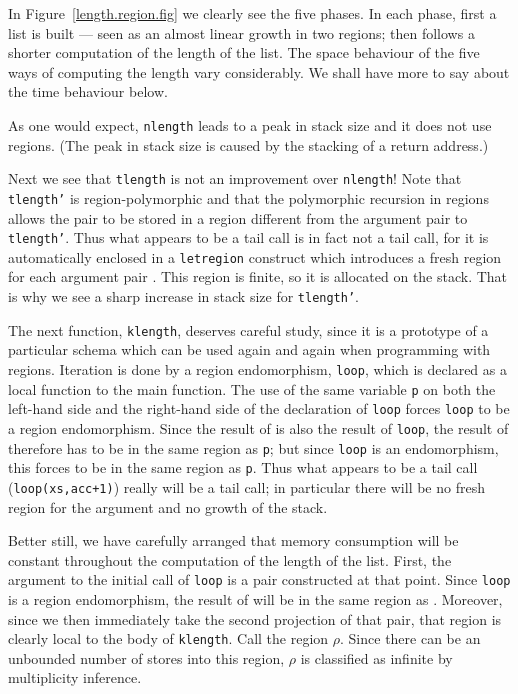 \documentclass[12pt]{book}
\begin{document}
In Figure~\ref{length.region.fig} we clearly see the five phases.
In each phase, first a list is built ---
seen as an almost linear growth in
two regions; 
then follows a shorter computation of the length of the list.
The space behaviour of the five ways of computing the length
vary considerably. We shall have more to say about the time behaviour
below.

As one would expect, 
{\tt nlength} leads to a peak in stack size and it
does not use regions. (The peak in stack size is caused by the
stacking of a return address.)

Next we see that {\tt tlength} is not an improvement over
{\tt nlength}! Note that {\tt tlength'} is region-polymorphic and that the
polymorphic recursion in regions allows the pair 
to be stored in a region different from  the argument pair to {\tt tlength'}.
Thus what appears to be a tail call is in fact not a tail call, for
it is automatically enclosed in a {\tt letregion} construct which introduces
a fresh region for each argument pair . This region is finite, so it is
allocated on the stack. That is why we see a sharp increase in
stack size for {\tt tlength'}.

The next function, {\tt klength}, deserves careful study, since
it is a prototype of a particular schema
which can be used again and again when programming with
regions. Iteration is done by a region endomorphism,
{\tt loop}, which is
declared as a local function to the main function. The use of
the same variable {\tt p} on both the left-hand side and the right-hand
side of the declaration of {\tt loop} forces {\tt loop} to be a region
endomorphism. Since the result of 
 is also the result of {\tt loop}, the
result of  therefore has to be in the same region as {\tt p};
but since {\tt loop} is an endomorphism, this forces 
 to be in the same region as {\tt p}.
Thus what appears to be a tail call ({\tt loop(xs,acc+1)})
really will be a tail call; in particular there will be no fresh region
for the argument and no growth
of the stack. 

Better still, we have carefully arranged that
memory consumption will be constant throughout the computation of
the length of the list. First, the argument to the 
initial call of {\tt loop} is a pair  constructed
at that point. Since {\tt loop} is a region endomorphism, the
result of  will be in the same region as .
Moreover, since we then immediately take the second projection of
that pair, that region is clearly local to the body of {\tt klength}.
Call the region  $\rho$. Since there can be an unbounded number of stores into
this region, $\rho$ is classified as infinite by multiplicity inference.
\end{document}
